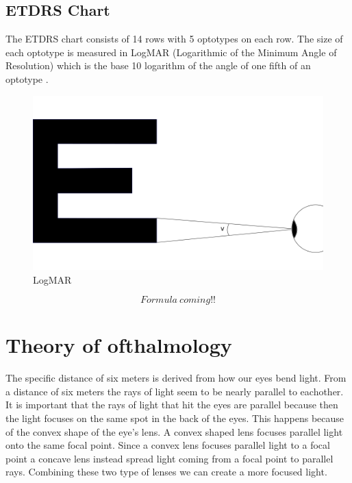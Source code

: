 \documentclass[12pt,a4paper,notitlepage]{report}
\begin{document}
\subsection{ETDRS Chart}
The ETDRS chart consists of 14 rows with 5 optotypes on each row. The size of each optotype is measured in LogMAR (Logarithmic of the Minimum Angle of Resolution) which is the base 10 logarithm of the angle of one fifth of an optotype \cite{Bailey}.

\begin{figure}[ht!]
\centering
\includegraphics[width=120mm]{images/logmar_calculation.png}
\caption{LogMAR\label{fig:logmar_calculation}}
\end{figure} 

\begin{equation}
  Formula \ coming!!
\end{equation}


\section{Theory of ofthalmology} %
The specific distance of six meters is derived from how our eyes bend light. From a distance of six meters the rays of light seem to be nearly parallel to eachother.
It is important that the rays of light that hit the eyes are parallel because then the light focuses on the same spot in the back of the eyes. This happens because of the convex shape of the eye's lens. A convex shaped lens focuses parallel light onto the same focal point. Since a convex lens focuses parallel light to a focal point a concave lens instead spread light coming from a focal point to parallel rays. Combining these two type of lenses we can create a more focused light. 
\end{document}
